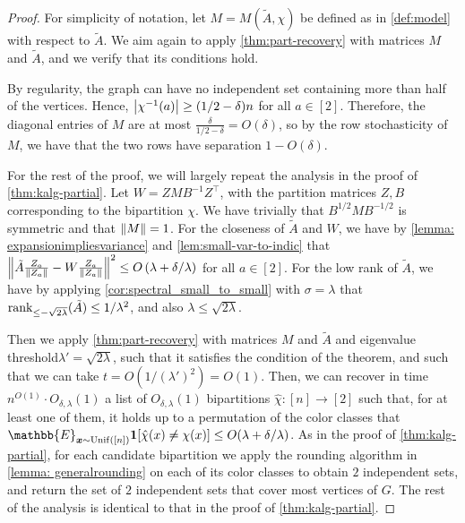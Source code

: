\begin{proof}
For simplicity of notation, let $M = M(\tilde{A}, \chi)$ be defined as in \cref{def:model} with respect to $\tilde{A}$.
We aim again to apply \cref{thm:part-recovery} with matrices $M$ and $\tilde{A}$, and we verify that its conditions hold.


By regularity, the graph can have no independent set containing more than half of the vertices. Hence, $\left\lvert\chi^{-1}(a)\right\rvert\geq (1/2-\delta)n$ for all $a \in [2]$. Therefore, the diagonal entries of $M$ are at most $\frac{\delta}{1/2-\delta}=O(\delta)$, so by the row stochasticity of $M$, we have that the two rows have separation $1-O(\delta)$.

For the rest of the proof, we will largely repeat the analysis in the proof of \cref{thm:kalg-partial}.
Let $W = Z M B^{-1} Z^\top$, with the partition matrices $Z, B$ corresponding to the bipartition $\chi$.
We have trivially that $B^{1/2} M B^{-1/2}$ is symmetric and that $\left\lVert M\right\rVert = 1$.
For the closeness of $\tilde{A}$ and $W$, we have by \cref{lemma: expansionimpliesvariance} and \cref{lem:small-var-to-indic} that $\left\lVert\tilde{A} \frac{Z_a}{\left\lVert Z_a\right\rVert} - W \frac{Z_a}{\left\lVert Z_a\right\rVert}\right\rVert^2 \leq O\left(\lambda + \delta/\lambda\right)$ for all $a \in [2]$.
For the low rank of $\tilde{A}$, we have by applying \cref{cor:spectral_small_to_small} with $\sigma=\lambda$ that $\operatorname{rank}_{\leq -\sqrt{2\lambda}}(\tilde{A}) \leq 1/\lambda^2$, and also $\lambda \leq \sqrt{2 \lambda}$. 

Then we apply \cref{thm:part-recovery} with matrices $M$ and $\tilde{A}$ and eigenvalue threshold\linebreak $\lambda' = \sqrt{2 \lambda}$, such that it satisfies the condition of the theorem, and such that we can take $t = O(1/(\lambda')^2) = O(1)$.
Then, we can recover in time $n^{O(1)} \cdot O_{\delta,\lambda}(1)$ a list of $O_{\delta,\lambda}(1)$ bipartitions $\hat{\chi}: [n] \to [2]$ such that, for at least one of them, it holds up to a permutation of the color classes that $\mathbb{E}_{\bm{x} \sim \operatorname{Unif}([n])} \1[\hat\chi(x) \neq \chi(x)] \leq O(\lambda+\delta/\lambda)$.
As in the proof of \cref{thm:kalg-partial}, for each candidate bipartition we apply the rounding algorithm in \cref{lemma: generalrounding} on each of its color classes to obtain $2$ independent sets, and return the set of $2$ independent sets that cover most vertices of $G$.
The rest of the analysis is identical to that in the proof of \cref{thm:kalg-partial}.
\end{proof}


